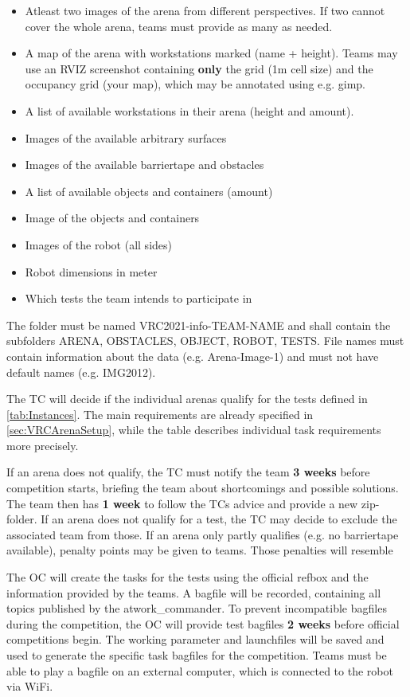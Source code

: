 \begin{itemize}
\item Atleast two images of the arena from different perspectives. If two cannot cover the whole arena, teams must provide as many as needed.
\item A map of the arena with workstations marked (name + height). Teams may use an RVIZ screenshot containing \textbf{only} the grid (1m cell size) and the occupancy grid (your map), which may be annotated using e.g. gimp.
\item A list of available workstations in their arena (height and amount).
\item Images of the available arbitrary surfaces
\item Images of the available barriertape and obstacles
\item A list of available objects and containers (amount)
\item Image of the objects and containers
\item Images of the robot (all sides)
\item Robot dimensions in meter
\item Which tests the team intends to participate in
\end{itemize}

The folder must be named VRC2021-info-TEAM-NAME and shall contain the subfolders ARENA, OBSTACLES, OBJECT, ROBOT, TESTS. 
File names must contain information about the data (e.g. Arena-Image-1) and must not have default names (e.g. IMG2012).

The TC will decide if the individual arenas qualify for the tests defined in \ref{tab:Instances}. 
The main requirements are already specified in \ref{sec:VRCArenaSetup}, while the table describes individual task requirements more precisely.
 
If an arena does not qualify, the TC must notify the team \textbf{3 weeks} before competition starts, 
briefing the team about shortcomings and possible solutions. 
The team then has \textbf{1 week} to follow the TCs advice and provide a new zip-folder.
If an arena does not qualify for a test, the TC may decide to exclude the associated team from those.
If an arena only partly qualifies (e.g. no barriertape available), penalty points may be given to teams.
Those penalties will resemble 

The OC will create the tasks for the tests using the official refbox and the information provided by the teams. 
A bagfile will be recorded, containing all topics published by the atwork\_commander.
To prevent incompatible bagfiles during the competition, 
the OC will provide test bagfiles \textbf{2 weeks} before official competitions begin.
The working parameter and launchfiles will be saved and used to generate the specific task bagfiles for the competition.
Teams must be able to play a bagfile on an external computer, which is connected to the robot via WiFi.

